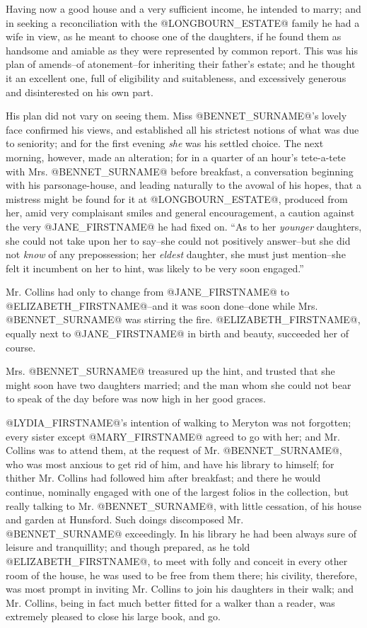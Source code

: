 Having now a good house and a very sufficient income, he intended to
marry; and in seeking a reconciliation with the @LONGBOURN_ESTATE@ family he had
a wife in view, as he meant to choose one of the daughters, if he found
them as handsome and amiable as they were represented by common report.
This was his plan of amends--of atonement--for inheriting their father's
estate; and he thought it an excellent one, full of eligibility and
suitableness, and excessively generous and disinterested on his own
part.

His plan did not vary on seeing them. Miss @BENNET_SURNAME@'s lovely face
confirmed his views, and established all his strictest notions of what
was due to seniority; and for the first evening \textit{she} was his settled
choice. The next morning, however, made an alteration; for in a
quarter of an hour's tete-a-tete with Mrs. @BENNET_SURNAME@ before breakfast, a
conversation beginning with his parsonage-house, and leading naturally
to the avowal of his hopes, that a mistress might be found for it at
@LONGBOURN_ESTATE@, produced from her, amid very complaisant smiles and general
encouragement, a caution against the very @JANE_FIRSTNAME@ he had fixed on. ``As to
her \textit{younger} daughters, she could not take upon her to say--she could
not positively answer--but she did not \textit{know} of any prepossession; her
\textit{eldest} daughter, she must just mention--she felt it incumbent on her
to hint, was likely to be very soon engaged.''

Mr. Collins had only to change from @JANE_FIRSTNAME@ to @ELIZABETH_FIRSTNAME@--and it was soon
done--done while Mrs. @BENNET_SURNAME@ was stirring the fire. @ELIZABETH_FIRSTNAME@, equally
next to @JANE_FIRSTNAME@ in birth and beauty, succeeded her of course.

Mrs. @BENNET_SURNAME@ treasured up the hint, and trusted that she might soon have
two daughters married; and the man whom she could not bear to speak of
the day before was now high in her good graces.

@LYDIA_FIRSTNAME@'s intention of walking to Meryton was not forgotten; every sister
except @MARY_FIRSTNAME@ agreed to go with her; and Mr. Collins was to attend them,
at the request of Mr. @BENNET_SURNAME@, who was most anxious to get rid of him,
and have his library to himself; for thither Mr. Collins had followed
him after breakfast; and there he would continue, nominally engaged with
one of the largest folios in the collection, but really talking to Mr.
@BENNET_SURNAME@, with little cessation, of his house and garden at Hunsford. Such
doings discomposed Mr. @BENNET_SURNAME@ exceedingly. In his library he had been
always sure of leisure and tranquillity; and though prepared, as he told
@ELIZABETH_FIRSTNAME@, to meet with folly and conceit in every other room of the
house, he was used to be free from them there; his civility, therefore,
was most prompt in inviting Mr. Collins to join his daughters in their
walk; and Mr. Collins, being in fact much better fitted for a walker
than a reader, was extremely pleased to close his large book, and go.

